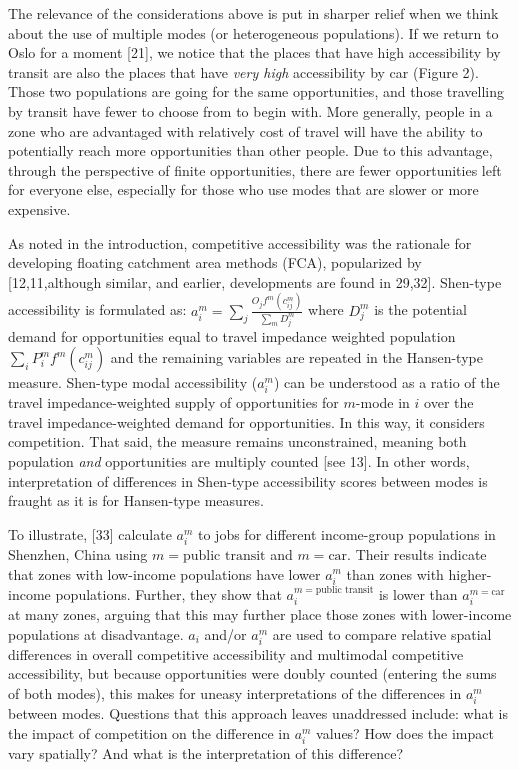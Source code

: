 \documentclass[10pt,letterpaper]{article}
\begin{document}
The relevance of the considerations above is put in sharper relief when
we think about the use of multiple modes (or heterogeneous populations).
If we return to Oslo for a moment {[}21{]}, we notice that the places
that have high accessibility by transit are also the places that have
\emph{very high} accessibility by car (Figure 2). Those two populations
are going for the same opportunities, and those travelling by transit
have fewer to choose from to begin with. More generally, people in a
zone who are advantaged with relatively cost of travel will have the
ability to potentially reach more opportunities than other people. Due
to this advantage, through the perspective of finite opportunities,
there are fewer opportunities left for everyone else, especially for
those who use modes that are slower or more expensive.

As noted in the introduction, competitive accessibility was the
rationale for developing floating catchment area methods (FCA),
popularized by {[}12,11,although similar, and earlier, developments are
found in 29,32{]}. Shen-type accessibility is formulated as:
\(a_i^m = \sum_j \frac{O_jf^m(c_{ij}^m)}{\sum_m D_j^m}\) where \(D_j^m\)
is the potential demand for opportunities equal to travel impedance
weighted population \(\sum_i P_i^m f^m(c_{ij}^m)\) and the remaining
variables are repeated in the Hansen-type measure. Shen-type modal
accessibility (\(a_i^m\)) can be understood as a ratio of the travel
impedance-weighted supply of opportunities for \(m\)-mode in \(i\) over
the travel impedance-weighted demand for opportunities. In this way, it
considers competition. That said, the measure remains unconstrained,
meaning both population \emph{and} opportunities are multiply counted
{[}see 13{]}. In other words, interpretation of differences in Shen-type
accessibility scores between modes is fraught as it is for Hansen-type
measures.

To illustrate, {[}33{]} calculate \(a_i^m\) to jobs for different
income-group populations in Shenzhen, China using
\(m = \text{public transit}\) and \(m=\text{car}\). Their results
indicate that zones with low-income populations have lower \(a_i^m\)
than zones with higher-income populations. Further, they show that
\(a_i^{m=\text{public transit}}\) is lower than \(a_i^{m=\text{car}}\)
at many zones, arguing that this may further place those zones with
lower-income populations at disadvantage. \(a_i\) and/or \(a_i^m\) are
used to compare relative spatial differences in overall competitive
accessibility and multimodal competitive accessibility, but because
opportunities were doubly counted (entering the sums of both modes),
this makes for uneasy interpretations of the differences in \(a_i^{m}\)
between modes. Questions that this approach leaves unaddressed include:
what is the impact of competition on the difference in \(a_i^m\) values?
How does the impact vary spatially? And what is the interpretation of
this difference?
\end{document}
